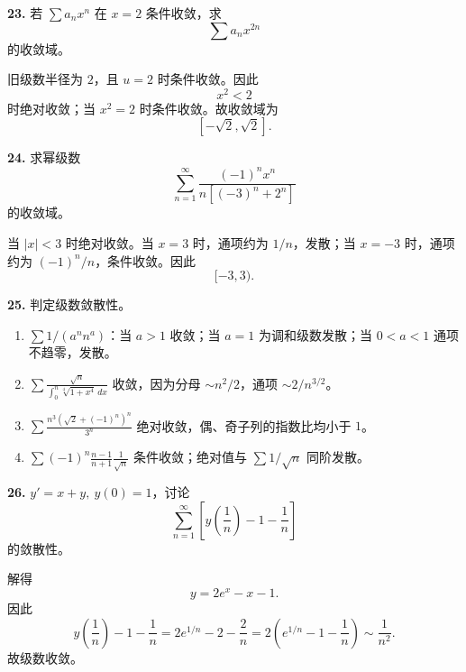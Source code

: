 \begin{problemblock}
\textbf{23.} 若 \(\sum a_nx^n\) 在 \(x=2\) 条件收敛，求
\[
\sum a_nx^{2n}
\]
的收敛域。
\end{problemblock}
\begin{solutionblock}
旧级数半径为 \(2\)，且 \(u=2\) 时条件收敛。因此
\[
x^2<2
\]
时绝对收敛；当 \(x^2=2\) 时条件收敛。故收敛域为
\[
\boxed{[-\sqrt2,\sqrt2]}.
\]
\end{solutionblock}

\begin{problemblock}
\textbf{24.} 求幂级数
\[
\sum_{n=1}^{\infty}\frac{(-1)^nx^n}{n[(-3)^n+2^n]}
\]
的收敛域。
\end{problemblock}
\begin{solutionblock}
当 \(|x|<3\) 时绝对收敛。当 \(x=3\) 时，通项约为 \(1/n\)，发散；当 \(x=-3\) 时，通项约为 \((-1)^n/n\)，条件收敛。因此
\[
\boxed{[-3,3)}.
\]
\end{solutionblock}

\begin{problemblock}
\textbf{25.} 判定级数敛散性。
\end{problemblock}
\begin{solutionblock}
\begin{enumerate}
\item \(\sum 1/(a^n n^a)\)：当 \(a>1\) 收敛；当 \(a=1\) 为调和级数发散；当 \(0<a<1\) 通项不趋零，发散。
\item \(\displaystyle \sum\frac{\sqrt n}{\int_0^n\sqrt[4]{1+x^4}\,dx}\) 收敛，因为分母 \(\sim n^2/2\)，通项 \(\sim2/n^{3/2}\)。
\item \(\displaystyle \sum\frac{n^3(\sqrt2+(-1)^n)^n}{3^n}\) 绝对收敛，偶、奇子列的指数比均小于 \(1\)。
\item \(\displaystyle \sum(-1)^n\frac{n-1}{n+1}\frac1{\sqrt n}\) 条件收敛；绝对值与 \(\sum1/\sqrt n\) 同阶发散。
\end{enumerate}
\end{solutionblock}

\begin{problemblock}
\textbf{26.} \(y'=x+y,\ y(0)=1\)，讨论
\[
\sum_{n=1}^{\infty}\left[y\left(\frac1n\right)-1-\frac1n\right]
\]
的敛散性。
\end{problemblock}
\begin{solutionblock}
解得
\[
y=2e^x-x-1.
\]
因此
\[
y\left(\frac1n\right)-1-\frac1n
=2e^{1/n}-2-\frac2n
=2\left(e^{1/n}-1-\frac1n\right)
\sim\frac1{n^2}.
\]
故级数收敛。
\end{solutionblock}

